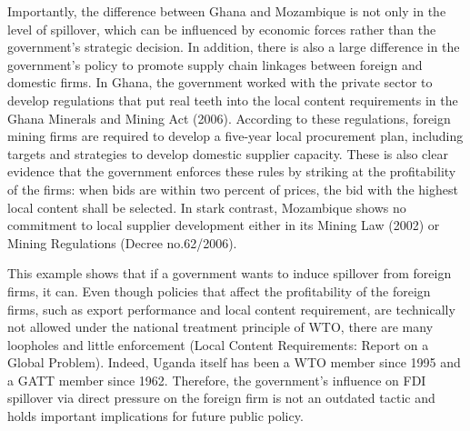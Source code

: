 Importantly, the difference between Ghana and Mozambique is not only in the level of spillover, which can be influenced by economic forces rather than the government's strategic decision. In addition, there is also a large difference in the government's policy to promote supply chain linkages between foreign and domestic firms. In Ghana, the government worked with the private sector to develop regulations that put real teeth into the local content requirements in the Ghana Minerals and Mining Act (2006). According to these regulations, foreign mining firms are required to develop a five-year local procurement plan, including targets and strategies to develop domestic supplier capacity. These is also clear evidence that the government enforces these rules by striking at the profitability of the firms: when bids are within two percent of prices, the bid with the highest local content shall be selected. In stark contrast, Mozambique shows no commitment to local supplier development either in its Mining Law (2002) or Mining Regulations (Decree no.62/2006).

This example shows that if a government wants to induce spillover from foreign firms, it can. Even though policies that affect the profitability of the foreign firms, such as export performance and local content requirement, are technically not allowed under the national treatment principle of WTO, there are many loopholes and little enforcement (Local Content Requirements: Report on a Global Problem). Indeed, Uganda itself has been a WTO member since 1995 and a GATT member since 1962. Therefore, the government's influence on FDI spillover via direct pressure on the foreign firm is not an outdated tactic and holds important implications for future public policy. 
